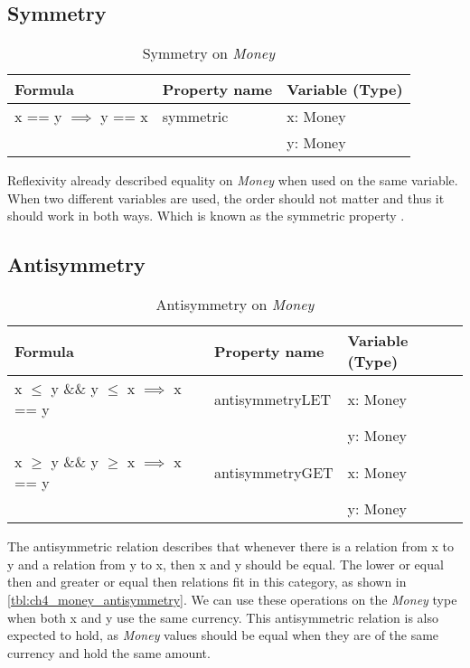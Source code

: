 \subsection{Symmetry}
\begin{table}[h!]
\centering
\begin{tabular}{|lll|}
\hline
                        \textbf{Formula}         & \textbf{Property name} & \textbf{Variable (Type)} \\ \hline
\rowcolor[HTML]{EFEFEF} x == y $\implies$ y == x & symmetric              & x: Money                 \\
\rowcolor[HTML]{EFEFEF}                          &                        & y: Money                 \\ \hline
\end{tabular}
\caption{Symmetry on \textit{Money}}
\label{tbl:ch4_money_symmetry}
\end{table}
Reflexivity already described equality on \textit{Money} when used on the same variable. When two different variables are used, the order should not matter and thus it should work in both ways. Which is known as the symmetric property \cite{raftery2011perspective}.

\subsection{Antisymmetry}
\begin{table}[h!]
\centering
\begin{tabular}{|lll|}
\hline
                        \textbf{Formula}                             & \textbf{Property name} & \textbf{Variable (Type)} \\ \hline
\rowcolor[HTML]{EFEFEF} x $\leq$ y \&\& y $\leq$ x $\implies$ x == y & antisymmetryLET        & x: Money                 \\
\rowcolor[HTML]{EFEFEF}                                              &                        & y: Money                 \\ 
                        x $\geq$ y \&\& y $\geq$ x $\implies$ x == y & antisymmetryGET        & x: Money                 \\
                                                                     &                        & y: Money                 \\ \hline
\end{tabular}
\caption{Antisymmetry on \textit{Money}}
\label{tbl:ch4_money_antisymmetry}
\end{table}
The antisymmetric relation describes that whenever there is a relation from x to y and a relation from y to x, then x and y should be equal. The lower or equal then and greater or equal then relations fit in this category, as shown in \autoref{tbl:ch4_money_antisymmetry}. We can use these operations on the \textit{Money} type when both x and y use the same currency. This antisymmetric relation is also expected to hold, as \textit{Money} values should be equal when they are of the same currency and hold the same amount.

